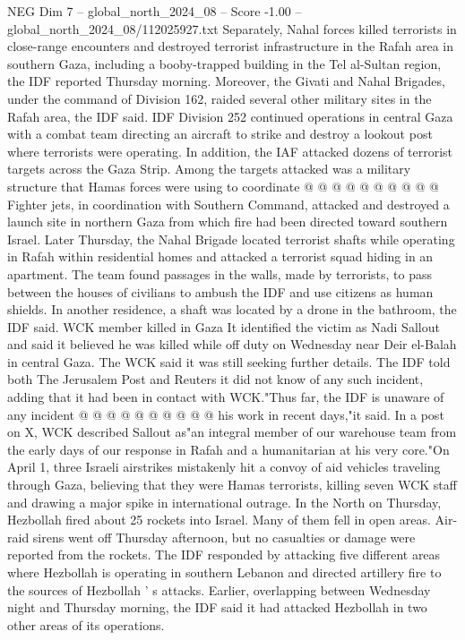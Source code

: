 \begin{textsample}{NEG Dim 7 – global\_north\_2024\_08 – Score -1.00 – global\_north\_2024\_08/112025927.txt}
Separately, Nahal forces killed terrorists in close-range encounters and destroyed terrorist infrastructure in the Rafah area in southern Gaza, including a booby-trapped building in the Tel al-Sultan region, the IDF reported Thursday morning.
Moreover, the Givati and Nahal Brigades, under the command of Division 162, raided several other military sites in the Rafah area, the IDF said.
IDF Division 252 continued operations in central Gaza with a combat team directing an aircraft to strike and destroy a lookout post where terrorists were operating.
In addition, the IAF attacked dozens of terrorist targets across the Gaza Strip.
Among the targets attacked was a military structure that Hamas forces were using to coordinate @ @ @ @ @ @ @ @ @ @ Fighter jets, in coordination with Southern Command, attacked and destroyed a launch site in northern Gaza from which fire had been directed toward southern Israel.
Later Thursday, the Nahal Brigade located terrorist shafts while operating in Rafah within residential homes and attacked a terrorist squad hiding in an apartment.
The team found passages in the walls, made by terrorists, to pass between the houses of civilians to ambush the IDF and use citizens as human shields.
In another residence, a shaft was located by a drone in the bathroom, the IDF said.
WCK member killed in Gaza It identified the victim as Nadi Sallout and said it believed he was killed while off duty on Wednesday near Deir el-Balah in central Gaza.
The WCK said it was still seeking further details.
The IDF told both The Jerusalem Post and Reuters it did not know of any such incident, adding that it had been in contact with WCK."Thus far, the IDF is unaware of any incident @ @ @ @ @ @ @ @ @ @ his work in recent days,"it said.
In a post on X, WCK described Sallout as"an integral member of our warehouse team from the early days of our response in Rafah and a humanitarian at his very core."On April 1, three Israeli airstrikes mistakenly hit a convoy of aid vehicles traveling through Gaza, believing that they were Hamas terrorists, killing seven WCK staff and drawing a major spike in international outrage.
In the North on Thursday, Hezbollah fired about 25 rockets into Israel.
Many of them fell in open areas.
Air-raid sirens went off Thursday afternoon, but no casualties or damage were reported from the rockets.
The IDF responded by attacking five different areas where Hezbollah is operating in southern Lebanon and directed artillery fire to the sources of Hezbollah ' s attacks.
Earlier, overlapping between Wednesday night and Thursday morning, the IDF said it had attacked Hezbollah in two other areas of its operations.

\end{textsample}
